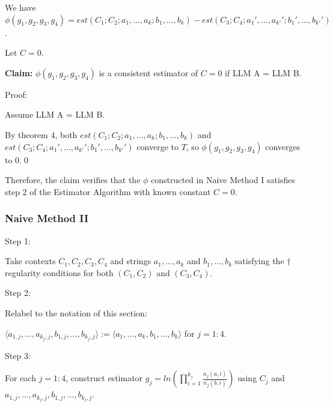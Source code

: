 \documentclass{article}
\begin{document}
We have $\displaystyle \phi \left( g_{1} ,g_{2} ,g_{3} ,g_{4}\right) =est\left( C_{1} ;C_{2} ;a_{1} ,...,a_{k} ;b_{1} ,...,b_{k}\right) -est\left( C_{3} ;C_{4} ;a_{1} ',...,a_{k'} ';b_{1} ',...,b_{k'} '\right)$.

Let $\displaystyle C=0$.



\textbf{Claim:} $\displaystyle \phi \left( g_{1} ,g_{2} ,g_{3} ,g_{4}\right)$ is a consistent estimator of $\displaystyle C=0$ if LLM A = LLM B.



Proof:

Assume LLM A = LLM B.

By theorem 4, both $\displaystyle est\left( C_{1} ;C_{2} ;a_{1} ,...,a_{k} ;b_{1} ,...,b_{k}\right)$ and $\displaystyle est\left( C_{3} ;C_{4} ;a_{1} ',...,a_{k'} ';b_{1} ',...,b_{k'} '\right)$ converge to $\displaystyle T$, so $\displaystyle \phi \left( g_{1} ,g_{2} ,g_{3} ,g_{4}\right)$ converges to 0.\qed 

Therefore, the claim verifies that the $\displaystyle \phi $ constructed in Naive Method I satisfies step 2 of the Estimator Algorithm with known constant $\displaystyle C=0$.



\subsubsection{Naive Method II}

Step 1:

Take contexts $\displaystyle C_{1} ,C_{2} ,C_{3} ,C_{4}$ and strings $\displaystyle a_{1} ,...,a_{k}$ and $\displaystyle b_{1} ,...,b_{k}$ satisfying the $\displaystyle \dagger $ regularity conditions for both $\displaystyle \left( C_{1} ,C_{2}\right)$ and $\displaystyle \left( C_{3} ,C_{4}\right)$.



Step 2:

Relabel to the notation of this section:

$\displaystyle \langle a_{1,j} ,...,a_{k_{j} ,j} ,b_{1,j} ,...,b_{k_{j} ,j} \rangle :=\langle a_{1} ,...,a_{k} ,b_{1} ,...,b_{k} \rangle $ for $\displaystyle j=1:4$.



Step 3:

For each $\displaystyle j=1:4$, construct estimator $\displaystyle g_{j} =ln\left(\prod _{i=1}^{k_{j}}\frac{n_{j}\left( a,i\right)}{n_{j}\left( b,i\right)}\right)$ using $\displaystyle C_{j}$ and $\displaystyle a_{1,j} ,...,a_{k_{j} ,j} ,b_{1,j} ,...,b_{k_{j} ,j}$.
\end{document}
